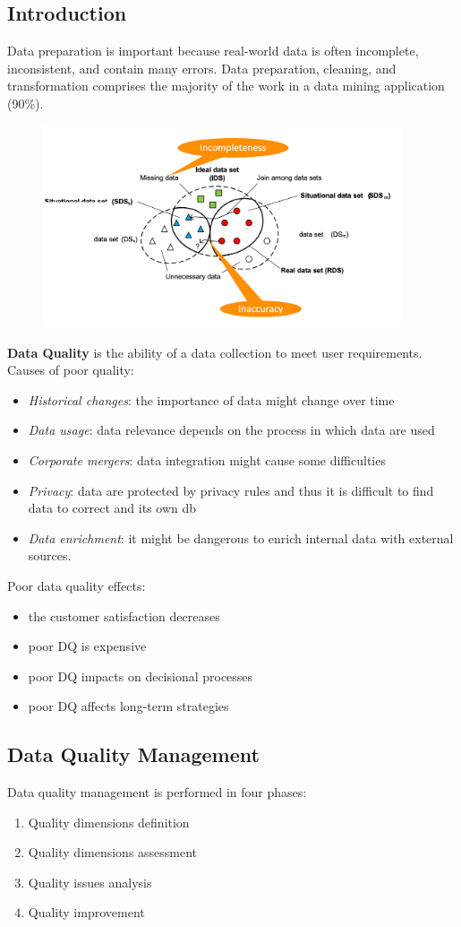 \documentclass[10pt,a4paper]{article}
\begin{document}
\subsection{Introduction}
Data preparation is important because real-world data is often incomplete, inconsistent, and contain many errors. Data preparation, cleaning, and transformation comprises the majority of the work in a data mining application (90\%).
\begin{figure}[htp]
\centering
\includegraphics[width=300pt]{images/data-quality-integration}\hfill
\end{figure}
\textbf{Data Quality} is the ability of a data collection to meet user requirements. 
Causes of poor quality:
\begin{itemize}
	\item \textit{Historical changes}: the importance of data might change over time
	\item \textit{Data usage}: data relevance depends on the process in which data are used
	\item \textit{Corporate mergers}: data integration might cause some difficulties
	\item \textit{Privacy}: data are protected by privacy rules and thus it is difficult to find data to correct and its own db
	\item \textit{Data enrichment}: it might be dangerous to enrich internal data with external sources.
\end{itemize}
Poor data quality effects:
\begin{itemize}
	\item the customer satisfaction decreases
	\item poor DQ is expensive
	\item poor DQ impacts on decisional processes
	\item poor DQ affects long-term strategies
\end{itemize}
\subsection{Data Quality Management}
Data quality management is performed in four phases:
\begin{enumerate}
	\item Quality dimensions definition
	\item Quality dimensions assessment
	\item Quality issues analysis
	\item Quality improvement
\end{enumerate}
\end{document}
